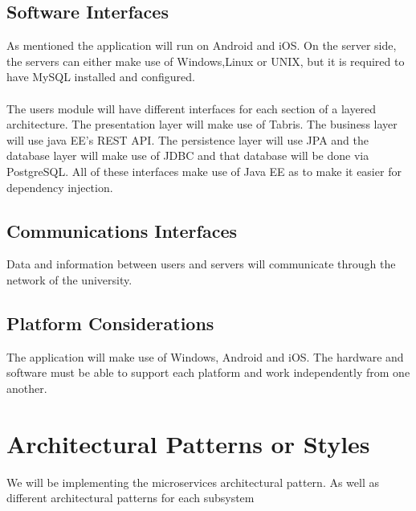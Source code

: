 \documentclass{article}
\begin{document}
	\subsection{Software Interfaces}	

As mentioned the application will run on Android and iOS. On the server side, the servers can either make use of Windows,Linux or UNIX, but it is required
to have MySQL installed and configured.\\\\
The users module will have different interfaces for each section of a layered architecture. The presentation layer will make use of Tabris. The business layer will use java EE's REST API.  The persistence layer will use JPA and the database layer will make use of JDBC and that database will be done via PostgreSQL. All of these interfaces make use of Java EE as to make it easier for dependency injection.
	
	\subsection{Communications Interfaces}
	
Data and information between users and servers will communicate through the network of the university.

	\subsection{Platform Considerations}
	The application will make use of Windows, Android and iOS. The hardware and software must be able to support each platform and work independently from one another.

	\pagebreak
 	\section{Architectural Patterns or Styles}
 	We will be implementing the microservices architectural pattern. As well as different architectural patterns for each subsystem
 	
\end{document}
